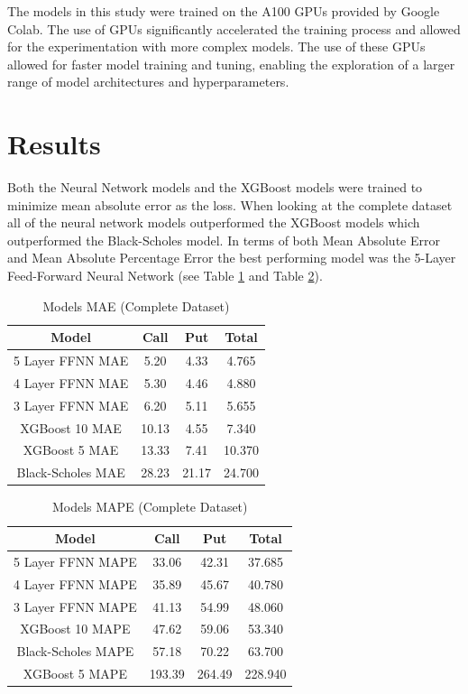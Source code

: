 \documentclass[a4paper]{article}
\begin{document}
The models in this study were trained on the A100 GPUs provided by Google Colab. The use of GPUs significantly accelerated the training process and allowed for the experimentation with more complex models. The use of these GPUs allowed for faster model training and tuning, enabling the exploration of a larger range of model architectures and hyperparameters.

\section{Results}
Both the Neural Network models and the XGBoost models were trained to minimize mean absolute error as the loss. When looking at the complete dataset all of the neural network models outperformed the XGBoost models which outperformed the Black-Scholes model. In terms of both Mean Absolute Error and Mean Absolute Percentage Error the best performing model was the 5-Layer Feed-Forward Neural Network (see Table \ref{table:modelcomparison_mae} and Table \ref{table:modelcomparison_mape}).
\begin{table}[htbp]
\centering
\caption{Models MAE (Complete Dataset)}
\label{table:modelcomparison_mae}
\begin{tabular}{cccc}
\hline
Model & Call & Put & Total \\
\hline
5 Layer FFNN MAE & 5.20 & 4.33 & 4.765 \\
4 Layer FFNN MAE & 5.30 & 4.46 & 4.880 \\
3 Layer FFNN MAE & 6.20 & 5.11 & 5.655 \\
XGBoost 10 MAE & 10.13 & 4.55 & 7.340 \\
XGBoost 5 MAE & 13.33 & 7.41 & 10.370 \\
Black-Scholes MAE & 28.23 & 21.17 & 24.700 \\
\hline
\end{tabular}
\end{table}

\begin{table}[htbp]
\centering
\caption{Models MAPE (Complete Dataset)}
\label{table:modelcomparison_mape}
\begin{tabular}{cccc}
\hline
Model & Call & Put & Total \\
\hline
5 Layer FFNN MAPE & 33.06 & 42.31 & 37.685 \\
4 Layer FFNN MAPE & 35.89 & 45.67 & 40.780 \\
3 Layer FFNN MAPE & 41.13 & 54.99 & 48.060 \\
XGBoost 10 MAPE & 47.62 & 59.06 & 53.340 \\
Black-Scholes MAPE & 57.18 & 70.22 & 63.700 \\
XGBoost 5 MAPE & 193.39 & 264.49 & 228.940 \\
\hline
\end{tabular}
\end{table}
\end{document}
